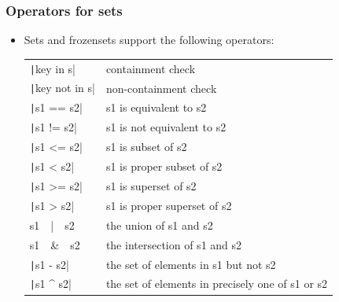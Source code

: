 \begin{frame}
    \frametitle{Operators for sets}

    \begin{itemize}
        \item Sets and frozensets support the following operators:
              \begin{table}[htbp]
                  \centering
                  \begin{tabular}{ll}
                      \texttt|key in s|            & containment check                                \\
                      \texttt|key not in s|        & non-containment check                            \\
                      \texttt|s1 == s2|            & s1 is equivalent to s2                           \\
                      \texttt|s1 != s2|            & s1 is not equivalent to s2                       \\
                      \texttt|s1 <= s2|            & s1 is subset of s2                               \\
                      \texttt|s1 < s2|             & s1 is proper subset of s2                        \\
                      \texttt|s1 >= s2|            & s1 is superset of s2                             \\
                      \texttt|s1 > s2|             & s1 is proper superset of s2                      \\
                      \footnotesize{s1}~~|~~\footnotesize{s2}  & the union of s1 and s2                           \\
                      \footnotesize{s1}~~\&~~\footnotesize{s2} & the intersection of s1 and s2                    \\
                      \texttt|s1 - s2|             & the set of elements in s1 but not s2             \\
                      \texttt|s1 ^ s2|             & the set of elements in precisely one of s1 or s2 \\
                  \end{tabular}%
              \end{table}%

    \end{itemize}

\end{frame}

